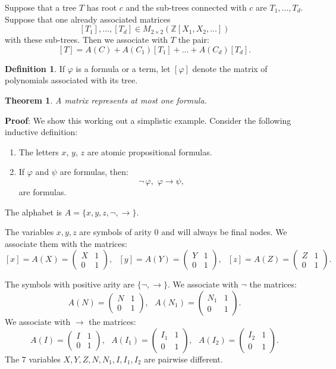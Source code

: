 \documentclass{article}
\theoremstyle{plain}
\newtheorem{theorem}{Theorem}[section]
\theoremstyle{definition}
\newtheorem{definition}{Definition}[section]
\begin{document}
Suppose that a tree $T$ has root $c$ and the sub-trees connected with $c$ are $T_1, \dots, T_d$. Suppose that one already associated matrices $$[T_1], \dots, [T_d] \in M_{2 \times 2}(\mathbb Z[X_1, X_2, \dots])$$ with these sub-trees. Then we associate with $T$ the pair:
$$[T] = A(C) + A(C_1) [T_1] + \dots + A(C_d) [T_d].$$


\begin{definition}
    If $\varphi$ is a formula or a term, let $[\varphi]$ denote the matrix of polynomials associated with its tree. 
\end{definition}

\begin{theorem}
    A matrix represents at most one formula.
\end{theorem}

{\bf Proof}: We show this working out a simplistic example. Consider the following inductive definition:
\begin{enumerate}
    \item The letters $x$, $y$, $z$ are atomic propositional formulas.
    \item If $\varphi$ and $\psi$ are formulas, then:
    $$\neg\,\varphi,\,\, \varphi \rightarrow \psi, $$
    are formulas.
\end{enumerate}
 
The alphabet is $A = \{x, y, z, \neg, \rightarrow \}$. 

The variables $x, y, z$ are symbols of arity $0$ and will always be final nodes. We associate them with the matrices:
$$
[x] =  A(X) = \begin{pmatrix}
    X & 1 \\ 0 & 1
\end{pmatrix},\,\,\,\,
[y] = A(Y) = \begin{pmatrix}
    Y & 1 \\ 0 & 1
\end{pmatrix},\,\,\,\,
[z] = A(Z) = \begin{pmatrix}
    Z & 1 \\ 0 & 1
\end{pmatrix}.
$$

The symbols with positive arity are $\{\neg, \rightarrow\}$. We associate with $\neg$ the matrices:
$$
A(N) = \begin{pmatrix}
    N & 1 \\ 0 & 1
\end{pmatrix},\,\,\,\,
A(N_1) = \begin{pmatrix}
    N_1 & 1 \\ 0 & 1
\end{pmatrix}.
$$
We associate with $\rightarrow$ the matrices:
$$
A(I) = \begin{pmatrix}
    I & 1 \\ 0 & 1
\end{pmatrix},\,\,\,\,
A(I_1) = \begin{pmatrix}
    I_1 & 1 \\ 0 & 1
\end{pmatrix},\,\,\,\,
A(I_2) = \begin{pmatrix}
    I_2 & 1 \\ 0 & 1
\end{pmatrix}.
$$
The $7$ variables $X, Y, Z, N, N_1, I, I_1, I_2$ are pairwise different.
\end{document}
